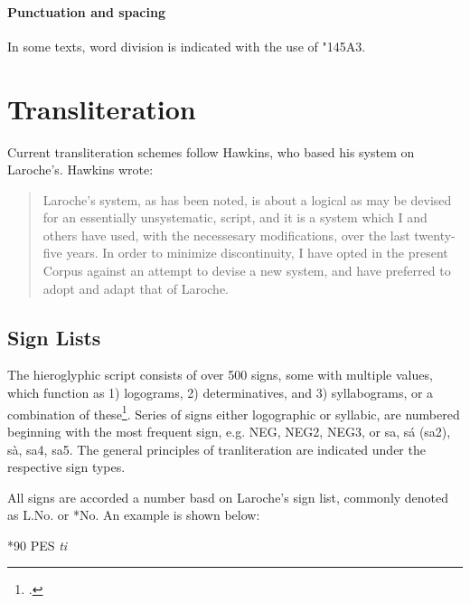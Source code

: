 \paragraph{Punctuation and spacing} In some texts, word division is indicated with the use of {\anatolian\char"145A3}.

 
 
\section{Transliteration} 

Current transliteration schemes follow Hawkins, who based his system on Laroche's. Hawkins wrote:

\begin{quotation}
Laroche's system, as has been noted, is about a logical as may be devised for an essentially unsystematic,
script, and it is a system which I and others have used, with the necessesary modifications, over the last twenty-five years. In order to minimize discontinuity, I have opted in the present Corpus against an attempt to devise a new system, and have preferred to adopt and adapt that of Laroche. 
\end{quotation}


\subsection{Sign Lists}

The hieroglyphic script consists of over 500 signs, some with multiple values, which function as 1) logograms, 2) determinatives, and 3) syllabograms, or a combination of these\footcite{Payne2014}. Series of signs either logographic or syllabic, are numbered beginning with the most frequent sign, e.g. NEG, NEG2, NEG3, or sa, s\'a (sa2), s\`a, sa4, sa5. The general principles of tranliteration are indicated under the respective sign types.

All signs are accorded a number basd on Laroche's sign list, commonly denoted as L.No. or *No. An example is shown below:


\def\PES{\bgroup\anatolian\scalebox{1}{\large\char"14463}\egroup\xspace}
\let\pes\PES

\begin{center}
\pes *90 PES \textit{ti}
\end{center} 


